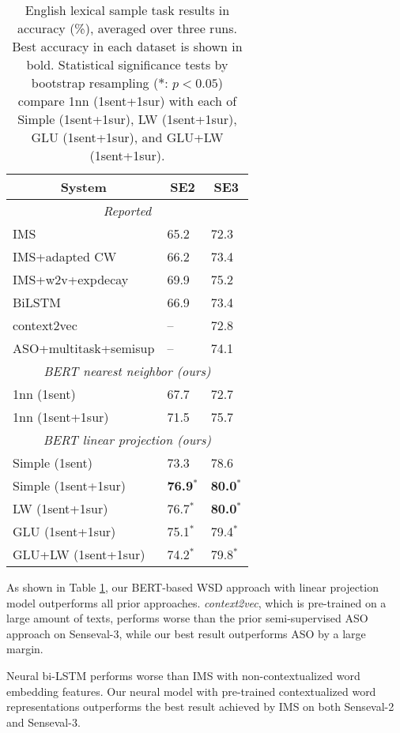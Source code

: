 \documentclass[11pt,a4paper]{article}
\begin{document}
\begin{table}[hbt]
\small
\centering
\begin{tabular}{|l|l|l|}
\hline
\multicolumn{1}{|c|}{\textbf{System}} & \multicolumn{1}{c|}{\textbf{SE2}} & \multicolumn{1}{c|}{\textbf{SE3}} \\
\hline
\multicolumn{3}{|c|}{\textit{Reported}} \\
\hline
IMS & 65.2 & 72.3 \\
IMS+adapted CW & 66.2 & 73.4 \\
IMS+w2v+expdecay & 69.9 & 75.2 \\
\hline
BiLSTM  & 66.9 & 73.4 \\
\hline
context2vec & -- & 72.8 \\
\hline
ASO+multitask+semisup & -- & 74.1 \\
\hline
\multicolumn{3}{|c|}{\textit{BERT nearest neighbor (ours)}} \\
\hline
1nn (1sent) & 67.7 & 72.7 \\
1nn (1sent+1sur) & 71.5 & 75.7 \\
\hline
\multicolumn{3}{|c|}{\textit{BERT linear projection (ours)}} \\
\hline
Simple (1sent) & 73.3 & 78.6 \\
Simple (1sent+1sur) & \textbf{76.9}$^{*}$ & \textbf{80.0}$^{*}$ \\
LW (1sent+1sur) & 76.7$^{*}$ & \textbf{80.0}$^{*}$ \\
GLU (1sent+1sur) & 75.1$^{*}$ & 79.4$^{*}$ \\
GLU+LW (1sent+1sur) & 74.2$^{*}$ & 79.8$^{*}$ \\
\hline
\end{tabular}
\caption{\label{tab:results_ls} English lexical sample task results in accuracy (\%), averaged over three runs. Best accuracy in each dataset is shown in bold. 
Statistical significance tests by bootstrap resampling ($*$: $p<0.05$) compare 1nn (1sent+1sur) with each of Simple (1sent+1sur), LW (1sent+1sur), GLU (1sent+1sur), and GLU+LW (1sent+1sur).}
\end{table} 
As shown in Table \ref{tab:results_ls}, our BERT-based WSD approach with linear projection model outperforms all prior approaches. \textit{context2vec}, which is pre-trained on a large amount of texts, performs worse than the prior semi-supervised ASO approach on Senseval-3, while our best result outperforms ASO by a large margin.

Neural bi-LSTM performs worse than IMS with non-contextualized word embedding features. Our neural model with pre-trained contextualized word representations outperforms the best result achieved by IMS on both Senseval-2 and Senseval-3.
\end{document}
